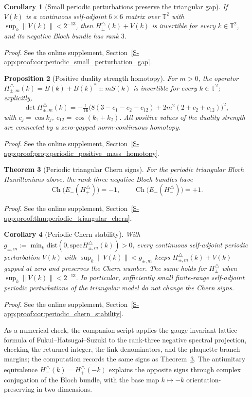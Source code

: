 \documentclass[11pt]{article}
\numberwithin{equation}{section}
\newtheorem{theorem}{Theorem}[section]
\newtheorem{proposition}[theorem]{Proposition}
\newtheorem{corollary}[theorem]{Corollary}
\theoremstyle{definition}
\theoremstyle{remark}
\newcommand{\proofsuppref}[1]{%
  \par\noindent\emph{Proof.} See the online supplement, Section~\ref{S-#1}.\par\medskip
}
\newcommand{\spec}{\mathrm{spec}}
\newcommand{\dist}{\mathrm{dist}}
\newcommand{\opnorm}[1]{\left\lVert#1\right\rVert}
\newcommand{\Ch}{\operatorname{Ch}}
\begin{document}
\begin{corollary}[Small periodic perturbations preserve the triangular gap]\label{cor:periodic_small_perturbation_gap}
If \(V(k)\) is a continuous self-adjoint \(6\times6\) matrix over \(\mathbb T^2\) with
\(\sup_k\opnorm{V(k)}<2^{-13}\), then \(H_\pm^\triangle(k)+V(k)\) is invertible for every
\(k\in\mathbb T^2\), and its negative Bloch bundle has rank \(3\).
\end{corollary}
\proofsuppref{app:proof:cor:periodic_small_perturbation_gap}

\begin{proposition}[Positive duality strength homotopy]\label{prop:periodic_positive_mass_homotopy}
For \(m>0\), the operator \(H_{\pm,m}^\triangle(k)=B(k)+B(k)^*\pm mS(k)\) is invertible for every
\(k\in\mathbb T^2\); explicitly,
\[
\det H_{\pm,m}^\triangle(k)
=
-\tfrac1{16}
\bigl(8(3-c_1-c_2-c_{12})+2m^2(2+c_2+c_{12})\bigr)^2,
\]
with \(c_j=\cos k_j\), \(c_{12}=\cos(k_1+k_2)\). All positive values of the duality strength are
connected by a zero-gapped norm-continuous homotopy.
\end{proposition}
\proofsuppref{app:proof:prop:periodic_positive_mass_homotopy}

\begin{theorem}[Periodic triangular Chern signs]\label{thm:periodic_triangular_chern}
For the periodic triangular Bloch Hamiltonians above, the rank-three negative Bloch bundles have
\[
\Ch\bigl(E_-(H_+^\triangle)\bigr)=-1,
\qquad
\Ch\bigl(E_-(H_-^\triangle)\bigr)=+1.
\]
\end{theorem}
\proofsuppref{app:proof:thm:periodic_triangular_chern}

\begin{corollary}[Periodic Chern stability]\label{cor:periodic_chern_stability}
With \(g_{\pm,m}:=\min_k\dist(0,\spec H_{\pm,m}^\triangle(k))>0\), every continuous self-adjoint
periodic perturbation \(V(k)\) with \(\sup_k\opnorm{V(k)}<g_{\pm,m}\) keeps
\(H_{\pm,m}^\triangle(k)+V(k)\) gapped at zero and preserves the Chern number. The same holds for
\(H_\pm^\triangle\) when \(\sup_k\opnorm{V(k)}<2^{-13}\). In particular, sufficiently small
finite-range self-adjoint periodic perturbations of the triangular model do not change the Chern
signs.
\end{corollary}
\proofsuppref{app:proof:cor:periodic_chern_stability}

As a numerical check, the companion script applies the gauge-invariant lattice formula of
Fukui--Hatsugai--Suzuki \cite{FukuiHatsugaiSuzuki} to the rank-three negative spectral projection,
checking the returned integer, the link denominators, and the plaquette branch margins; the
computation records the same signs as Theorem~\ref{thm:periodic_triangular_chern}. The
antiunitary equivalence
\(H_-^\triangle(k)=\overline{H_+^\triangle(-k)}\) explains the opposite signs through complex
conjugation of the Bloch bundle, with the base map \(k\mapsto-k\) orientation-preserving in two
dimensions.
\end{document}
